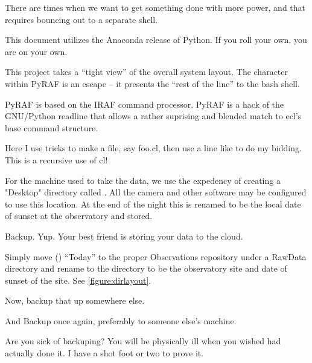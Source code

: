 \documentclass[letter,11pt,oneside]{article}
\newcommand{\dhl}[1]{{\color{verbcolor}{\texttt#1}}}
\begin{document}
There are times when we want to get something done with more power,
and that requires bouncing out to a separate shell.

This document utilizes the Anaconda release of Python. If you roll your own,
you are on your own. 

This project takes a ``tight view'' of the overall system layout. The
\dhl{!} character within PyRAF is an escape -- it presents the 
``rest of the line'' to the bash shell. 

PyRAF is based on the IRAF \dhl{ecl} command processor. PyRAF is a
hack of the GNU/Python readline that allows a rather suprising and
blended match to ecl's base command structure.

Here I use tricks to make a \dhl{.cl} file, say foo.cl, then use a line
like \dhl{cl < foo.cl} to do my bidding. This is a recursive use of cl!

For the machine used to take the data, we use the expedency of
creating a "Desktop" directory called \dhl{Today}. All the camera and
other software may be configured to use this location. At the end of
the night this is renamed to be the local date of sunset at the
observatory and stored.

Backup. Yup. Your best friend is storing your data to the cloud.

Simply move (\dhl{mv}) ``Today'' to the proper Observations repository
under a RawData directory and rename to the directory to be the
observatory site and date of sunset of the site. See \ref{figure:dirlayout}.

Now, backup that up somewhere else.

And Backup once again, preferably to someone else's machine.

Are you sick of backuping? You will be physically ill when you wished
had actually done it. I have a shot foot or two to prove it.






\clearpage







\clearpage
\renewcommand*{\refname}{Bibliography and References}
\end{document}
